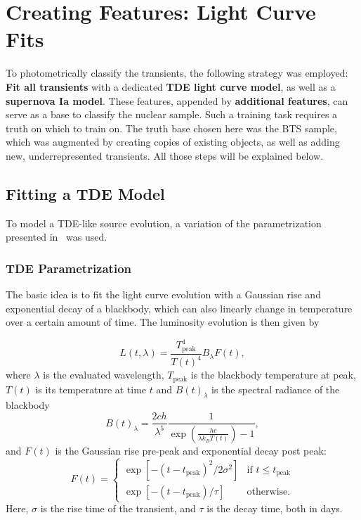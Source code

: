 \section{Creating Features: Light Curve Fits}
To photometrically classify the transients, the following strategy was employed: \textbf{Fit all transients} with a dedicated \textbf{TDE light curve model}, as well as a \textbf{supernova Ia model}. These features, appended by \textbf{additional features}, can serve as a base to classify the nuclear sample. Such a training task requires a truth on which to train on. The truth base chosen here was the BTS sample, which was augmented by creating copies of existing objects, as well as adding new, underrepresented transients. All those steps will be explained below.

\subsection{Fitting a TDE Model}\label{tde_model}
To model a TDE-like source evolution, a variation of the parametrization presented in~\cite{Velzen2021a} was used.

\subsubsection{TDE Parametrization}
The basic  idea is to fit the light curve evolution with a Gaussian rise and exponential decay of a blackbody, which can also linearly change in temperature over a certain amount of time. The luminosity evolution is then given by

\begin{equation}
  L(t,\lambda) = \frac{T_\text{peak}^4}{T(t)^4} B_\lambda F(t),
\end{equation}
where $\lambda$ is the evaluated wavelength, $T_\text{peak}$ is the blackbody temperature at peak, $T(t)$ is its temperature at time $t$ and $B(t)_\lambda$ is the spectral radiance of the blackbody
\begin{equation}
  B(t)_\lambda = \frac{2 c h}{\lambda^5} \frac{1}{\exp(\frac{hc}{\lambda k_B T(t)})-1},
\end{equation}
and $F(t)$ is the Gaussian rise pre-peak and exponential decay post peak:
\begin{equation}
  F(t) = \begin{cases}
    \exp[-(t-t_\text{peak})^2/2\sigma^2] & \text{if } t\leq t_\text{peak} \\
    \exp[-(t-t_\text{peak})/\tau]        & \text{otherwise.}
  \end{cases}
\end{equation}
Here, $\sigma$ is the rise time of the transient, and $\tau$ is the decay time, both in days.

